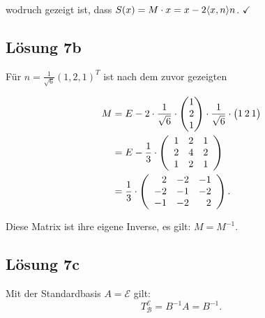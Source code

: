 \documentclass[main.tex]{subfiles}
\begin{document}
wodruch gezeigt ist, dass $S(x) = M\cdot x = x-2 \langle x,n\rangle n$. $\checkmark$


\subsection*{Lösung 7b}

Für $n = \frac{1}{\sqrt{6}} (1, 2, 1)^T$ ist nach dem zuvor gezeigten

\begin{align*}
    M &= E -2 \cdot \frac{1}{\sqrt{6}}\cdot \vektor{1 \\ 2 \\ 1} \cdot \frac{1}{\sqrt{6}}\cdot \vektor{1 & 2 & 1} \\
      &= E - \frac{1}{3} \cdot \eqmatrix{rrr}{
        1 & 2 & 1 \\
        2 & 4 & 2 \\
        1 & 2 & 1} \\
      &= \frac{1}{3} \cdot \eqmatrix{rrr}{
        2 & -2 & -1 \\
        -2 & -1 & -2 \\
        -1 & -2 & 2}.
\end{align*}

Diese Matrix ist ihre eigene Inverse, es gilt: $M = M^{-1}$.


\subsection*{Lösung 7c}
Mit der Standardbasis $A = \mathcal{E}$ gilt:
$$
    T^{\mathcal{E}}_{\mathcal{B}} = B^{-1} A = B^{-1}.
$$
\end{document}
